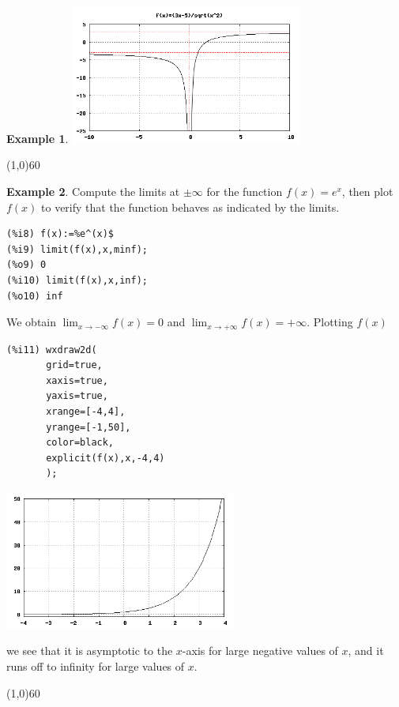 \documentclass[10.5pt,twoside]{report}
\theoremstyle{definition}
\newtheorem{exmp}{Example}[section]
\begin{document}
\begin{exmp}
\includegraphics[width=3in]{example_3_2_1}

\end{exmp}

\line(1,0){60}
\linethickness{0.5mm}



\begin{exmp}  Compute the limits at $\pm \infty$ for the function $f(x)=e^{x}$, then plot $f(x)$ to verify that the function behaves as indicated by the limits.\\

\begin{verbatim}
(%i8) f(x):=%e^(x)$
(%i9) limit(f(x),x,minf);
(%o9) 0
(%i10) limit(f(x),x,inf);
(%o10) inf
\end{verbatim}

We obtain $\lim_{x \to -\infty}f(x)=0$ and $\lim_{x \to +\infty}f(x)=+\infty$.  Plotting $f(x)$

\begin{verbatim}
(%i11) wxdraw2d(
       grid=true,
       xaxis=true,
       yaxis=true,
       xrange=[-4,4],
       yrange=[-1,50],
       color=black,
       explicit(f(x),x,-4,4)
       );
\end{verbatim}

\includegraphics[width=3in]{example_3_2_2}

we see that it is asymptotic to the $x$-axis for large negative values of $x$, and it runs off to infinity for large values of $x$.

\end{exmp}

\line(1,0){60}
\linethickness{0.5mm}
\end{document}
